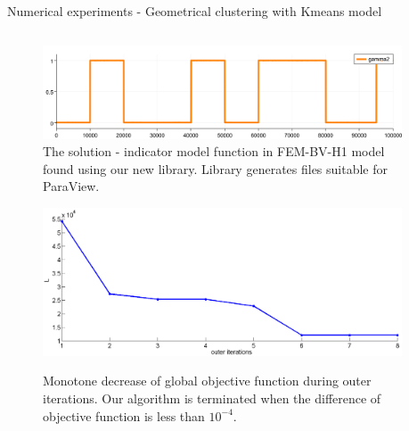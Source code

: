 \documentclass[final,hyperref={pdfpagelabels=false}]{beamer}
\begin{document}
\begin{frame}[t]
\begin{columns}[t]
\begin{column}{.48\textwidth}
\begin{block}{Numerical experiments -  Geometrical clustering with Kmeans model}
\begin{columns}[T]
\begin{column}{0.46\linewidth}
\begin{figure}[H]
\begin{center}
			\includegraphics[width=1.0\linewidth, angle=0, clip = true]{figures/gamma2.png} 

			\caption{The solution - indicator model function in FEM-BV-H1 model found using our new library. 
					 Library generates files suitable for ParaView.
					 }
			\label{fig:indicator}	
		\end{center}
	\end{figure}
	\begin{figure}[H]
		\begin{center}
			\includegraphics[width=1.0\linewidth, angle=0, clip = true]{figures/L.png} \\

			\caption{Monotone decrease of global objective function during outer iterations. Our algorithm is terminated when the difference of objective function is less than $10^{-4}$.
					 }
			\label{fig:L}	
		\end{center}
	\end{figure}
\end{column}	
\begin{column}{0.02\linewidth}\end{column}
\end{columns}





\end{block}





\end{column}
\end{columns}
\end{frame}
\end{document}
